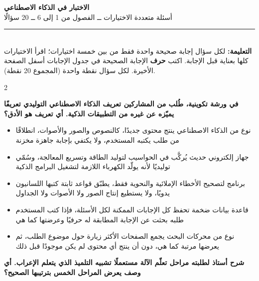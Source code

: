 \documentclass[10pt,a4paper]{article}
\begin{document}
\begin{center}
{\LARGE\khatt\textbf{الاختبار في الذكاء الاصطناعي}}\\[3pt]
{\normalsize أسئلة متعددة الاختيارات ــ الفصول من 1 إلى 6 ــ 20 سؤالًا}
\end{center}
\vspace{-4pt}\rule{\textwidth}{0.6pt}\\
{\small\textbf{التعليمة:} لكل سؤال إجابة صحيحة واحدة فقط من بين خمسة اختيارات؛ اقرأ الاختيارات كلها بعناية قبل الإجابة.
اكتب \textbf{حرف} الإجابة الصحيحة في جدول الإجابات أسفل الصفحة الأخيرة.
لكل سؤال نقطة واحدة (المجموع 20 نقطة).}
\vspace{-2pt}
\begin{multicols}{2}

\noindent\begin{minipage}{\linewidth}
\hangindent=0.7cm\textbf{في ورشة تكوينية، طُلب من المشاركين تعريف الذكاء الاصطناعي التوليدي تعريفًا يميّزه عن غيره من التطبيقات الذكية. أي تعريف هو الأدق؟}
\begin{itemize}[leftmargin=0.95cm, labelsep=4pt, itemsep=1pt, topsep=3pt, parsep=0pt]
  \item[\textbf{أ)}] نوع من الذكاء الاصطناعي ينتج محتوى جديدًا، كالنصوص والصور والأصوات، انطلاقًا من طلب يكتبه المستخدم، ولا يكتفي بإجابة جاهزة مخزنة
  \item[\textbf{ب)}] جهاز إلكتروني حديث يُركَّب في الحواسيب لتوليد الطاقة وتسريع المعالجة، وسُمّي توليديًا لأنه يولّد الكهرباء اللازمة لتشغيل البرامج الذكية
  \item[\textbf{ج)}] برنامج لتصحيح الأخطاء الإملائية والنحوية فقط، يطبّق قواعد ثابتة كتبها اللسانيون يدويًا، ولا يستطيع إنتاج الصور ولا الأصوات ولا الجداول
  \item[\textbf{د)}] قاعدة بيانات ضخمة تحفظ كل الإجابات الممكنة لكل الأسئلة، فإذا كتب المستخدم طلبه بحثت عن الإجابة المطابقة له حرفيًا وعرضتها كما هي
  \item[\textbf{هـ)}] نوع من محركات البحث يجمع الصفحات الأكثر زيارة حول موضوع الطلب، ثم يعرضها مرتبة كما هي، دون أن ينتج أي محتوى لم يكن موجودًا قبل ذلك
\end{itemize}
\end{minipage}\par\vspace{8pt plus 6pt}
\noindent\begin{minipage}{\linewidth}
\hangindent=0.7cm\textbf{شرح أستاذ لطلبته مراحل تعلّم الآلة مستعملًا تشبيه التلميذ الذي يتعلم الإعراب. أي وصف يعرض المراحل الخمس بترتيبها الصحيح؟}

\end{minipage}
\end{multicols}
\end{document}
